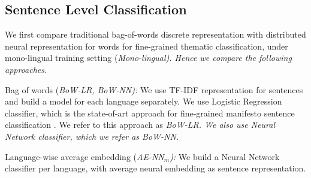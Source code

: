 \documentclass[11pt,a4paper]{article}
\begin{document}
\subsection{Sentence Level Classification}
We first compare traditional bag-of-words discrete representation with distributed neural representation for words for fine-grained thematic classification, under mono-lingual training setting (\em{Mono-lingual}). \rm Hence we compare the following approaches. 

\begin{description}
\item{Bag of words (\em{BoW-LR}, \em{BoW-NN}):} We use TF-IDF representation for sentences and build a model for each language separately. We use Logistic Regression classifier, which is the state-of-art approach for fine-grained manifesto sentence classification \cite{biessmann2016automating}. We refer to this approach as \em{BoW-LR}. \rm We also use Neural Network classifier, which we refer as \em{BoW-NN}. \rm

\item{Language-wise average embedding (\em{AE-NN$_{m}$}):} \rm We build a Neural Network classifier per language, with average neural embedding as sentence representation.
\end{description}


\end{document}
